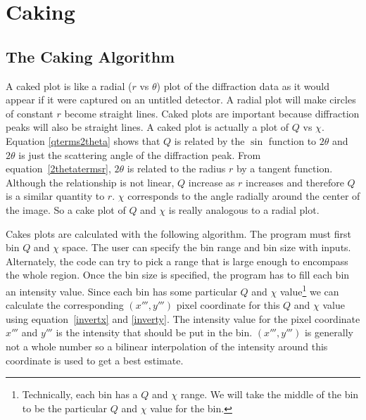 \chapter{Caking}\label{Caking}

\section{The Caking Algorithm}

A caked plot is like a radial ($r$ vs $\theta$) plot 
of the diffraction data as it would appear if it were
captured on an untitled detector. A radial plot will make
circles of constant $r$ become straight lines.
Caked plots are important because diffraction peaks will 
also be straight lines. A caked plot is actually a 
plot of $Q$ vs $\chi$. Equation \ref{qterms2theta} shows
that $Q$ is related by the $\sin$ function to 
$2\theta$ and $2\theta$ is just the scattering angle of 
the diffraction peak. From equation~\ref{2thetatermsr},
$2\theta$ is related to the radius $r$ by a tangent function.
Although the relationship is not linear, $Q$ increase as $r$ 
increases and therefore $Q$ is a similar quantity to $r$.
$\chi$ corresponds to the angle radially around the center 
of the image. So a cake plot of $Q$ and $\chi$ is really 
analogous to a radial plot.

Cakes plots are calculated with the following algorithm.
The program must first bin $Q$ and $\chi$ space. The user 
can specify the bin
range and bin size with inputs. Alternately, the code 
can try to pick a range that is large enough to encompass 
the whole region. Once the bin size is specified, the program 
has to fill each bin an intensity value. Since each bin has 
some particular $Q$ and $\chi$ value\footnote{Technically,
each bin has a $Q$ and $\chi$ range. We will
take the middle of the bin to be the
particular $Q$ and $\chi$ value for the bin.} 
we can calculate the corresponding $(x''',y''')$
pixel coordinate for this $Q$ and $\chi$ value using 
equation~\ref{invertx} and \ref{inverty}. The
intensity value for the pixel coordinate $x'''$ and $y'''$
is the intensity that should be put in the bin.
$(x''',y''')$ is generally not a whole number so a
bilinear interpolation of the intensity around
this coordinate is used to get a best estimate.

